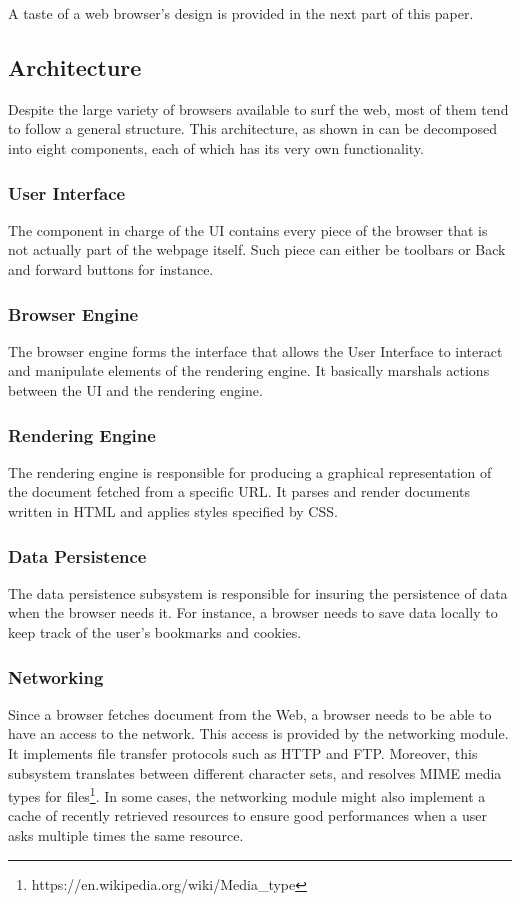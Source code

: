 \documentclass[journal]{IEEEtran}
\begin{document}
\medskip

A taste of a web browser's design is provided in the next part of this paper.

\subsection{Architecture}

Despite the large variety of browsers available to surf the web, most of them tend to follow a general structure. This architecture, as shown in \cite{architectureWebBrowsers} \cite{howBrowsersWork} can be decomposed into eight components, each of which has its very own functionality.

\subsubsection{User Interface}
The component in charge of the UI contains every piece of the browser that is not actually part of the webpage itself. Such piece can either be toolbars or Back and forward buttons for instance.

\subsubsection{Browser Engine}
The browser engine forms the interface that allows the User Interface to interact and manipulate elements of the rendering engine. It basically marshals actions between the UI and the rendering engine.

\subsubsection{Rendering Engine}
The rendering engine is responsible for producing a graphical representation of the document fetched from a specific URL. It parses and render documents written in HTML and applies styles specified by CSS.

\subsubsection{Data Persistence}
The data persistence subsystem is responsible for insuring the persistence of data when the browser needs it. For instance, a browser needs to save data locally to keep track of the user's bookmarks and cookies.

\subsubsection{Networking}
Since a browser fetches document from the Web, a browser needs to be able to have an access to the network. This access is provided by the networking module. It implements file transfer protocols such as HTTP and FTP. Moreover, this subsystem translates between different character sets, and resolves MIME media types for files\footnote{https://en.wikipedia.org/wiki/Media\_type}. In some cases, the networking module might also implement a cache of recently retrieved resources to ensure good performances when a user asks multiple times the same resource.
\end{document}
